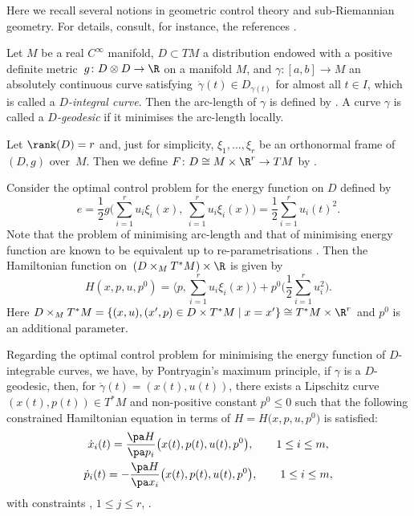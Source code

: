 Here we recall several notions in geometric control theory and sub-Riemannian geometry.
For details, consult, for instance, the references \cite{AS, BC, Montgomery0, Montgomery}.

Let $M$ be a real $C^\infty$ manifold,
$D \subset TM$ a distribution endowed with a positive definite met\-ric~${g\colon D\otimes D \to \R}$
on a manifold $M$, and $\gamma\colon [a, b] \to M$ an absolutely continuous curve sat\-is\-fy\-ing~$\dot{\gamma}(t) \in D_{\gamma(t)}$
for almost all $t \in I$, which is called a {\it $D$-integral curve}.
Then the arc-length of $\gamma$ is defined by
.
A curve $\gamma$ is called a {\it $D$-geodesic} if it minimises the arc-length locally.

Let $\rank(D) = r$ and, just for simplicity, $\xi_1, \dots, \xi_r$ be an orthonormal frame of $(D, g)$ over~$M$.
Then we define $F\colon D \cong M\times \R^r \to TM$ by .

Consider the optimal control problem for the energy function on $D$ defined by
\[
e = \frac{1}{2} g\Biggl(\sum_{i=1}^r u_i \xi_i(x), \ \sum_{i=1}^r u_i \xi_i(x)\Biggr) = \frac{1}{2} \sum_{i=1}^r u_i(t)^2.
\]
Note that the problem of minimising arc-length and that of minimising energy function are known to be equivalent
up to re-parametrisations \cite{AS, Montgomery}.
Then the Hamiltonian function on~$(D \times_M T^*M) \times \R$ is given by
\[
H(x, p, u, p^0) = \Biggl\langle p, \sum_{i=1}^r u_i\xi_i(x)\Biggr\rangle + p^0\Biggl(\frac{1}{2}\sum_{i=1}^r u_i^2\Biggr).
\]
Here $D \times_M T^*M = \{ (x, u), (x', p) \in D\times T^*M \mid x = x'\} \cong T^*M \times \R^r$ and $p^0$ is an additional parameter.

Regarding the optimal control problem for minimising the energy function of $D$-integrable curves,
we have, by Pontryagin's maximum principle,
if $\gamma$ is a $D$-geodesic, then, for $\dot{\gamma}(t) = (x(t), u(t))$,
there exists a Lipschitz curve $(x(t), p(t)) \in T^*M$ and non-positive constant $p^0 \leq 0$
such that the following constrained Hamiltonian equation in terms of $H = H\bigl(x, p, u, p^0\bigr)$
is satisfied:
\begin{gather*}
\dot{x}_i(t) = \frac{\pa H}{\pa p_i}\bigl(x(t), p(t), u(t), p^0\bigr), \qquad 1 \leq i \leq m,
\\
\dot{p}_i(t) = - \frac{\pa H}{\pa x_i}\bigl(x(t), p(t), u(t), p^0\bigr), \qquad 1 \leq i \leq m,
\end{gather*}
with constraints
, $1 \leq j \leq r$, .


